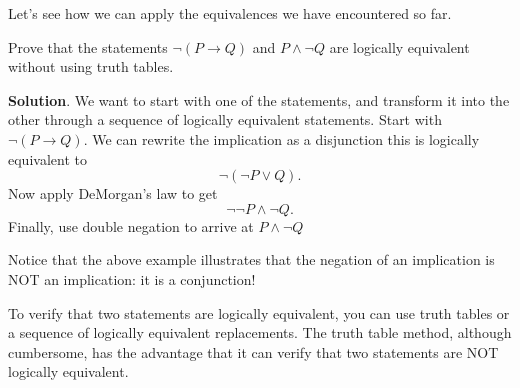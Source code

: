 \documentclass[11pt,]{book}
\theoremstyle{ptxplainnotitle}
\theoremstyle{ptxplaintitle}
\theoremstyle{ptxdefinitionnotitle}
\theoremstyle{ptxdefinitiontitle}
\theoremstyle{ptxdefinitionnotitle}
\theoremstyle{ptxdefinitiontitle}
\theoremstyle{ptxdefinitionnotitle}
\theoremstyle{ptxdefinitiontitle}
\theoremstyle{ptxdefinitiontitlenonumber}
\theoremstyle{ptxdefinitiontitlenonumber}
\numberwithin{equation}{chapter}
\newcommand{\imp}{\rightarrow}
\begin{document}
\hypertarget{p-2406}{}%
Let's see how we can apply the equivalences we have encountered so far.%
\begin{example}\label{example-59}
\hypertarget{p-2407}{}%
Prove that the statements \(\neg(P \imp Q)\) and \(P\wedge \neg Q\) are logically equivalent without using truth tables.%
\par\smallskip%
\noindent\textbf{Solution}.\hypertarget{solution-274}{}\quad%
\hypertarget{p-2408}{}%
We want to start with one of the statements, and transform it into the other through a sequence of logically equivalent statements. Start with \(\neg(P \imp Q)\). We can rewrite the implication as a disjunction this is logically equivalent to%
\begin{equation*}
\neg(\neg P \vee Q).
\end{equation*}
Now apply DeMorgan's law to get%
\begin{equation*}
\neg\neg P \wedge \neg Q.
\end{equation*}
Finally, use double negation to arrive at \(P \wedge \neg Q\)%
\end{example}
\hypertarget{p-2409}{}%
Notice that the above example illustrates that the negation of an implication is NOT an implication: it is a conjunction!%
\par
\hypertarget{p-2410}{}%
To verify that two statements are logically equivalent, you can use truth tables or a sequence of logically equivalent replacements. The truth table method, although cumbersome, has the advantage that it can verify that two statements are NOT logically equivalent.%
\end{document}

